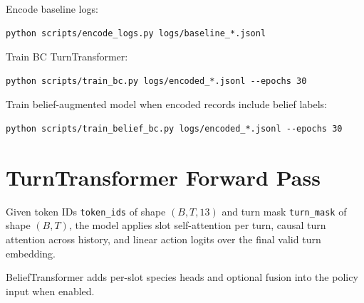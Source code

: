 Encode baseline logs:

\begin{verbatim}
python scripts/encode_logs.py logs/baseline_*.jsonl
\end{verbatim}

Train BC TurnTransformer:

\begin{verbatim}
python scripts/train_bc.py logs/encoded_*.jsonl --epochs 30
\end{verbatim}

Train belief-augmented model when encoded records include belief labels:

\begin{verbatim}
python scripts/train_belief_bc.py logs/encoded_*.jsonl --epochs 30
\end{verbatim}

\section{TurnTransformer Forward Pass}

Given token IDs \texttt{token\_ids} of shape $(B, T, 13)$ and turn mask
\texttt{turn\_mask} of shape $(B, T)$, the model applies slot self-attention
per turn, causal turn attention across history, and linear action logits over
the final valid turn embedding.

BeliefTransformer adds per-slot species heads and optional fusion into the
policy input when enabled.
